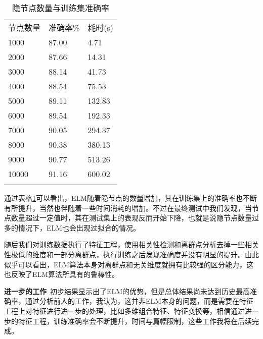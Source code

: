 \documentclass[conference]{IEEEtran}
\begin{document}
\begin{table}[h!t]
	\center
	\caption{隐节点数量与训练集准确率}
	\label{tab:1}
	\begin{tabular}{p{80pt}<{\centering}p{60pt}<{\centering}p{60pt}<{\raggedleft}}
		\hline\\[-2.9mm]\hline
		节点数量 & 准确率\% & 耗时(s) \\
		\hline
		1000 & 87.00 & 4.71\\
		2000 & 87.66 & 14.31\\
		3000 & 88.14 & 41.73\\
		4000 & 88.54 & 75.53\\
		5000 & 89.11 & 132.83\\
		6000 & 89.54 & 192.33\\
		7000 & 90.05 & 294.37\\
		8000 & 90.38 & 380.13\\
		9000 & 90.77 & 513.26\\
		10000 & 91.16 & 600.02\\
		\hline\\[-2.9mm]\hline
	\end{tabular}
\end{table}

通过表格\ref{tab:1}可以看出，ELM随着隐节点的数量增加，其在训练集上的准确率也不断有所提升，当然也伴随着一些时间消耗的增加。不过在最终测试中我们发现，当节点数量超过一定值时，其在测试集上的表现反而开始下降，也就是说隐节点数量过多的情况下，ELM也会出现过拟合的情况。

随后我们对训练数据执行了特征工程，使用相关性检测和离群点分析去掉一些相关性极低的维度和一部分离群点，执行训练之后发现准确度并没有明显的提升。由此似乎可以看出，ELM算法本身对离群点和无关维度就拥有比较强的区分能力，这也反映了ELM算法所具有的鲁棒性。

\textbf{进一步的工作}\ 初步结果显示出了ELM的优势，但是总体结果尚未达到历史最高准确率，通过分析前人的工作，我认为，这并非ELM本身的问题，而是需要在特征工程上对特征进行进一步的处理，比如多维组合特征、特征变换等，相信通过进一步的特征工程，训练准确率会不断提升，时间与篇幅限制，这些工作我将在后续完成。



\end{document}
